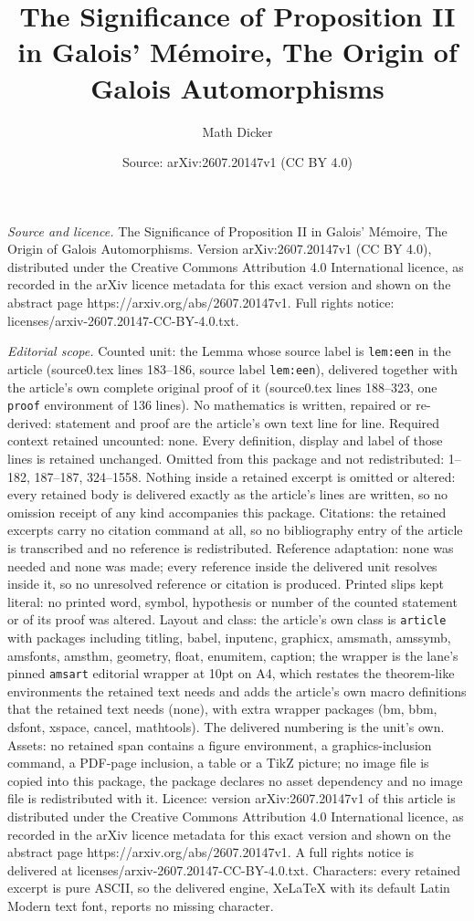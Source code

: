 \documentclass[10pt,a4paper]{amsart}
\title[The Significance of Proposition II in Galois' M\'emoire, The]{The Significance of Proposition II in Galois' M\'emoire, The Origin of Galois Automorphisms}
\author{Math Dicker}
\date{Source: arXiv:2607.20147v1 (CC BY 4.0)}
\begin{document}
\maketitle

\noindent\emph{Source and licence.} The Significance of Proposition II in Galois' M\'emoire, The Origin of Galois Automorphisms. Version arXiv:2607.20147v1 (CC BY 4.0), distributed under the Creative Commons Attribution 4.0 International licence, as recorded in the arXiv licence metadata for this exact version and shown on the abstract page https://arxiv.org/abs/2607.20147v1. Full rights notice: licenses/arxiv-2607.20147-CC-BY-4.0.txt.\par\smallskip

\noindent\textit{Editorial scope.} Counted unit: the Lemma whose source label is \texttt{lem:een} in the article (source0.tex lines 183--186, source label \texttt{lem:een}), delivered together with the article's own complete original proof of it (source0.tex lines 188--323, one \texttt{proof} environment of 136 lines). No mathematics is written, repaired or re-derived: statement and proof are the article's own text line for line. Required context retained uncounted: none. Every definition, display and label of those lines is retained unchanged. Omitted from this package and not redistributed: 1--182, 187--187, 324--1558. Nothing inside a retained excerpt is omitted or altered: every retained body is delivered exactly as the article's lines are written, so no omission receipt of any kind accompanies this package. Citations: the retained excerpts carry no citation command at all, so no bibliography entry of the article is transcribed and no reference is redistributed. Reference adaptation: none was needed and none was made; every reference inside the delivered unit resolves inside it, so no unresolved reference or citation is produced. Printed slips kept literal: no printed word, symbol, hypothesis or number of the counted statement or of its proof was altered. Layout and class: the article's own class is \texttt{article} with packages including titling, babel, inputenc, graphicx, amsmath, amssymb, amsfonts, amsthm, geometry, float, enumitem, caption; the wrapper is the lane's pinned \texttt{amsart} editorial wrapper at 10pt on A4, which restates the theorem-like environments the retained text needs and adds the article's own macro definitions that the retained text needs (none), with extra wrapper packages (bm, bbm, dsfont, xspace, cancel, mathtools). The delivered numbering is the unit's own. Assets: no retained span contains a figure environment, a graphics-inclusion command, a PDF-page inclusion, a table or a TikZ picture; no image file is copied into this package, the package declares no asset dependency and no image file is redistributed with it. Licence: version arXiv:2607.20147v1 of this article is distributed under the Creative Commons Attribution 4.0 International licence, as recorded in the arXiv licence metadata for this exact version and shown on the abstract page https://arxiv.org/abs/2607.20147v1. A full rights notice is delivered at licenses/arxiv-2607.20147-CC-BY-4.0.txt. Characters: every retained excerpt is pure ASCII, so the delivered engine, XeLaTeX with its default Latin Modern text font, reports no missing character.
\end{document}
